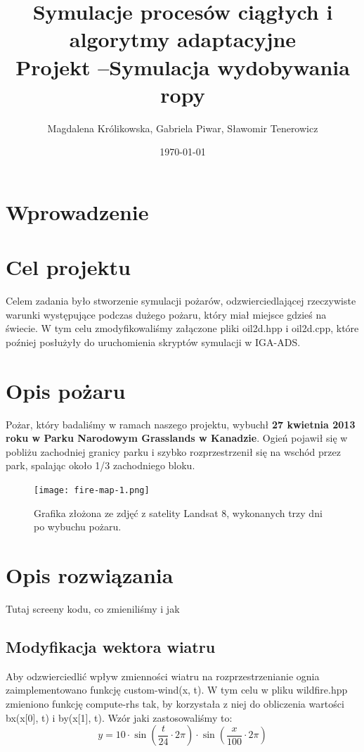 \documentclass[onecolumn,12pt]{article}
\begin{document}
\title{Symulacje procesów ciągłych i algorytmy adaptacyjne\\
Projekt –Symulacja wydobywania ropy}
\author{Magdalena Królikowska, Gabriela Piwar, Sławomir Tenerowicz}
\date{\today}
\maketitle

\tableofcontents
\thispagestyle{empty}

\section{Wprowadzenie}
 

\section{Cel projektu}
Celem zadania było stworzenie symulacji pożarów, odzwierciedlającej rzeczywiste warunki występujące podczas dużego pożaru, który miał miejsce gdzieś na świecie. W tym celu zmodyfikowaliśmy załączone pliki oil2d.hpp i oil2d.cpp, które poźniej posłużyły do uruchomienia skryptów symulacji w IGA-ADS.  

\section{Opis pożaru}
Pożar, który badaliśmy w ramach naszego projektu, wybuchł \textbf{27 kwietnia 2013 roku w Parku Narodowym Grasslands w Kanadzie}. Ogień pojawił się w pobliżu zachodniej granicy parku i szybko rozprzestrzenił się na wschód przez park, spalając około 1/3 zachodniego bloku. 

\begin{figure}[H]
    \centering
    \texttt{[image: fire-map-1.png]}
    \caption{Grafika złożona ze zdjęć z satelity Landsat 8, wykonanych trzy dni po wybuchu pożaru.}
    \label{fig:example}
\end{figure}
        
\section{Opis rozwiązania}
Tutaj screeny kodu, co zmieniliśmy i jak

\subsection{Modyfikacja wektora wiatru}
Aby odzwierciedlić wpływ zmienności wiatru na rozprzestrzenianie ognia zaimplementowano funkcję custom-wind(x, t). W tym celu w pliku wildfire.hpp  zmieniono funkcję compute-rhs tak, by korzystała z niej do obliczenia wartości bx(x[0], t) i by(x[1], t). Wzór jaki zastosowaliśmy to:
\[
y = 10 \cdot\sin\left(\frac{t}{24} \cdot 2\pi\right) \cdot \sin\left(\frac{x}{100} \cdot 2\pi\right)
\]
\end{document}
